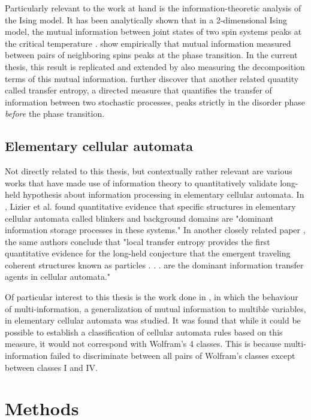 \documentclass[12pt]{article}
\begin{document}
Particularly relevant to the work at hand is the information-theoretic analysis of the Ising model. It has been analytically shown that in a 2-dimensional Ising model, the mutual information between joint states of two spin systems peaks at the critical temperature \cite{mi-ising-analytic}. \cite{barnett-ising} show empirically  that mutual information measured between pairs of neighboring spins peaks at the phase transition. In the current thesis, this result is replicated and extended by also measuring the decomposition terms of this mutual information. \cite{barnett-ising} further discover that another related quantity called transfer entropy, a directed measure that quantifies the transfer of information between two stochastic processes, peaks strictly in the disorder phase \textit{before} the phase transition. 

\subsection{Elementary cellular automata}

Not directly related to this thesis, but contextually rather relevant are various works that have made use of information theory to quantitatively validate long-held hypothesis about information processing in elementary cellular automata. In \cite{active-inf-storage}, Lizier et al. found quantitative evidence that specific structures in elementary cellular automata called blinkers and background domains are "dominant information storage processes in these systems." In another closely related paper \cite{local-transfer-entropy-ca}, the same authors conclude that "local transfer entropy provides the first quantitative evidence for the long-held conjecture that the emergent traveling coherent structures known as particles . . . are the dominant information transfer agents in cellular automata."

Of particular interest to this thesis is the work done in \cite{multi-inf-ca}, in which the behaviour of multi-information, a generalization of mutual information to multible variables, in elementary cellular automata was studied. It was found that while it could be possible to establish a classification of cellular automata rules based on this measure, it would not correspond with Wolfram's 4 classes. This is because multi-information failed to discriminate between all pairs of Wolfram's classes except between classes I and IV.

\newpage
\section{Methods}
\end{document}
